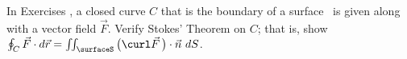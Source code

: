 {\noindent In Exercises}
{, a closed curve $C$ that is the boundary of a surface \surfaceS\ is given along with a vector field $\vec F$. Verify Stokes' Theorem on $C$; that is, show $\oint_C \vec F\cdot d\vec r = \iint_\surfaceS\big(\curl \vec F\,\big)\cdot\vec n\ dS$.
}
